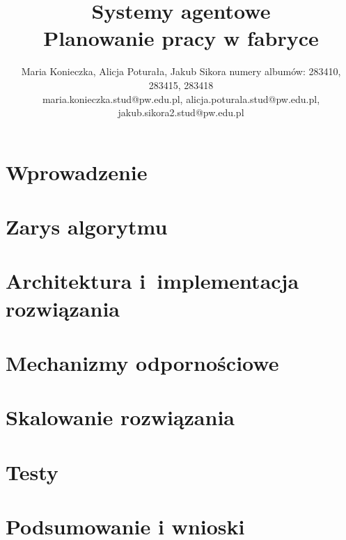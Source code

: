 \documentclass{article}
\title{Systemy agentowe\\ Planowanie pracy w fabryce}
\author{
Maria Konieczka, Alicja Poturała, Jakub Sikora
\affiliations
numery albumów: 283410, 283415, 283418 \\
\emails
maria.konieczka.stud@pw.edu.pl, alicja.poturala.stud@pw.edu.pl, jakub.sikora2.stud@pw.edu.pl
}
\begin{document}
\maketitle

\section{Wprowadzenie}
\label{sec:wprowadzenie}


\section{Zarys algorytmu}
\label{sec:algorytm}


\section{Architektura i~implementacja rozwiązania}
\label{sec:architektura}


\section{Mechanizmy odpornościowe}
\label{sec:recovery}


\section{Skalowanie rozwiązania}
\label{sec:skalowanie}

\lstset{
	tabsize=2,
	breaklines=true,
	basicstyle=\tiny,
}
\section{Testy}
\label{sec:testy}


\section{Podsumowanie i wnioski}
\label{sec:podsumowanie}




\end{document}
